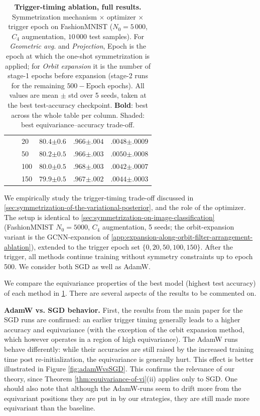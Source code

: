 \documentclass{article}
\begin{document}
\begin{table}[t]
\begin{tabular}{@{}lll ccc@{}}
       &  & 20 & $80.4{\scriptstyle\pm0.6}$ & $.966{\scriptstyle\pm.004}$ & $.0048{\scriptstyle\pm.0009}$ \\
       &  & 50 & $80.2{\scriptstyle\pm0.5}$ & $.966{\scriptstyle\pm.003}$ & $.0050{\scriptstyle\pm.0008}$ \\
       &  & \cellcolor{gray!15}100 & \cellcolor{gray!15}$80.0{\scriptstyle\pm0.5}$ & \cellcolor{gray!15}$\mathbf{.968}{\scriptstyle\pm.003}$ & \cellcolor{gray!15}$\mathbf{.0042}{\scriptstyle\pm.0007}$ \\
       &  & 150 & $79.9{\scriptstyle\pm0.5}$ & $.967{\scriptstyle\pm.002}$ & $.0044{\scriptstyle\pm.0003}$ \\
    \bottomrule
    \end{tabular}
    \caption{\textbf{Trigger-timing ablation, full results.} Symmetrization mechanism $\times$ optimizer $\times$ trigger epoch on FashionMNIST ($N_0=5\,000$, $C_4$ augmentation, $10\,000$ test samples). For \emph{Geometric avg.} and \emph{Projection}, Epoch is the epoch at which the one-shot symmetrization is applied; for \emph{Orbit expansion} it is the number of stage-1 epochs before expansion (stage-2 runs for the remaining $500-\text{Epoch}$ epochs). All values are mean $\pm$ std over 5 seeds, taken at the best test-accuracy checkpoint. \textbf{Bold}: best across the whole table per column. \colorbox{gray!15}{Shaded}: best equivariance--accuracy trade-off.}
    \label{tab:trigger-timing-full}
\end{table}

We empirically study the trigger-timing trade-off discussed in \cref{sec:symmetrization-of-the-variational-posterior}, and the role of the optimizer. The setup is identical to \cref{sec:symmetrization-on-image-classification} (FashionMNIST $N_{0} = 5000$, $C_{4}$ augmentation, 5 seeds; the orbit-expansion variant is the GCNN-expansion of \cref{app:expansion-along-orbit-filter-arrangement-ablation}), extended to the trigger epoch set $\{0, 20, 50, 100, 150\}$. After the trigger, all methods continue training without symmetry constraints up to epoch 500. We consider both SGD as well as AdamW.

We compare the equivariance properties of the best model (highest test accuracy) of each method in \cref{tab:trigger-timing-full}. There are several aspects of the results to be commented on.

\textbf{AdamW vs. SGD behavior.} First, the results from the main paper for the SGD runs are confirmed: an earlier trigger timing generally leads to a higher accuracy and equivariance (with the exception of the orbit expansion method, which however operates in a region of high equivariance). The AdamW runs behave differently: while their accuracies are still raised by the increased training time post re-initialization, the equivariance is generally hurt. This effect is better illustrated in Figure \ref{fig:adamWvsSGD}. This confirms the relevance of our theory, since Theorem \ref{thm:equivariance-of-vi}(ii) applies only to SGD. One should also note that although the AdamW-runs seem to drift more from the equivariant positions they are put in by our strategies, they are still made more equivariant than the baseline.
\end{document}
